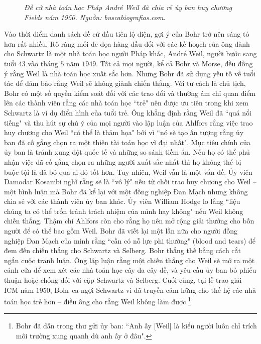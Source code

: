\begin{multicols}{2}
\begin{figure}[H]
		\caption{\small\textit{\color{lichsutoanhoc}Đề cử nhà toán học Pháp André Weil đã chia rẽ ủy ban huy chương Fields năm 1950. Nguồn: buscabiografias.com.}}
		\vspace*{-10pt}
	\end{figure}
	Vào thời điểm danh sách đề cử đầu tiên lộ diện, gợi ý của Bohr trở nên sáng tỏ hơn rất nhiều. Rõ ràng mối đe dọa hàng đầu đối với các kế hoạch của ông dành cho Schwartz là một nhà toán học người Pháp khác, André Weil, người bước sang tuổi $43$ vào tháng $5$ năm $1949$. Tất cả mọi người, kể cả Bohr và Morse, đều đồng ý rằng Weil là nhà toán học xuất sắc hơn. Nhưng Bohr đã sử dụng yếu tố về tuổi tác để đảm bảo rằng Weil sẽ không giành chiến thắng. Với tư cách là chủ tịch, Bohr có một số quyền kiểm soát đối với các trao đổi và thường ám chỉ quan điểm lên các thành viên rằng các nhà toán học ``trẻ" nên được ưu tiên trong khi xem Schwartz là ví dụ điển hình của tuổi trẻ. Ông khẳng định rằng Weil đã ``quá nổi tiếng" và thu hút sự chú ý của mọi người vào lập luận của Ahlfors rằng việc trao huy chương cho Weil ``có thể là thảm họa" bởi vì ``nó sẽ tạo ấn tượng rằng ủy ban đã cố gắng chọn ra một thiên tài toán học vĩ đại nhất".
	\vskip 0.05cm
	Mục tiêu chính của ủy ban là tránh xung đột quốc tế và những so sánh tiềm ẩn. Nếu họ có thể phủ nhận việc đã cố gắng chọn ra những người xuất sắc nhất thì họ không thể bị buộc tội là đã bỏ qua ai đó tốt hơn.
	\vskip 0.05cm
	Tuy nhiên, Weil vẫn là một vấn đề. Ủy viên Damodar Kosambi nghĩ rằng sẽ là ``vô lý" nếu từ chối trao huy chương cho Weil -- một bình luận mà Bohr đã kể lại với một đồng nghiệp Đan Mạch nhưng không chia sẻ với các thành viên ủy ban khác. Ủy viên William Hodge lo lắng ``liệu chúng ta có thể trốn tránh trách nhiệm của mình hay không" nếu Weil không chiến thắng. Thậm chí Ahlfors còn cho rằng họ nên mở rộng giải thưởng cho bốn người để có thể bao gồm Weil. Bohr đã viết lại một lần nữa cho người đồng nghiệp Đan Mạch của mình rằng ``cần có nỗ lực phi thường" (blood and tears) để đem đến chiến thắng cho Schwartz và Selberg.
	\vskip 0.05cm
	Bohr thắng thế bằng cách cắt ngắn cuộc tranh luận. Ông lập luận rằng một chiến thắng cho Weil sẽ mở ra một cánh cửa để xem xét các nhà toán học cây đa cây đề, và yêu cầu ủy ban bỏ phiếu thuận hoặc chống đối với cặp Schwartz và Selberg. Cuối cùng, tại lễ trao giải ICM năm $1950$, Bohr ca ngợi Schwartz vì đã truyền cảm hững cho thế hệ các nhà toán học trẻ hơn -- điều ông cho rằng Weil không làm được.\footnote[9]{\color{lichsutoanhoc}Bohr đã dẫn trong thư gửi ủy ban: ``Anh ấy [Weil] là kiểu người luôn chỉ trích môi trường xung quanh dù anh ấy ở đâu".}

\end{multicols}
